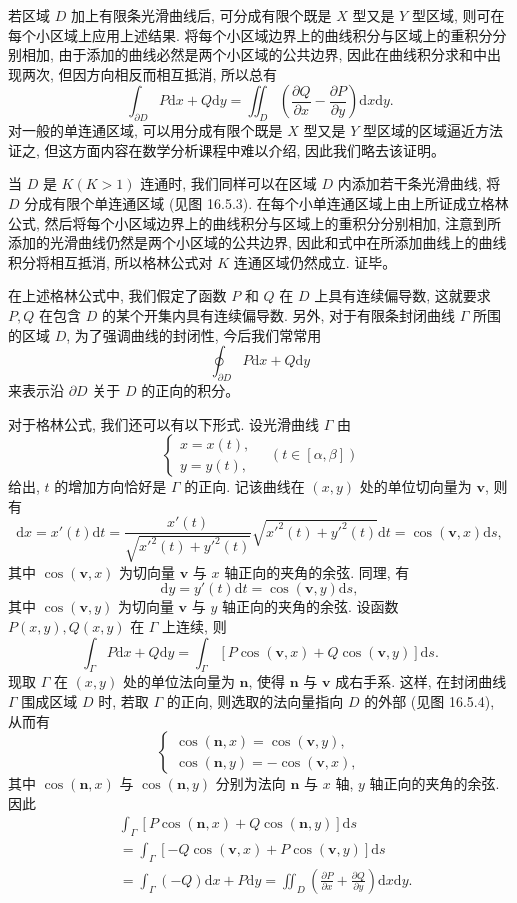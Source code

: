 \documentclass[UTF8, 12pt, fontset=fandol, oneside]{ctexart}
\begin{document}
若区域 $D$ 加上有限条光滑曲线后, 可分成有限个既是 $X$ 型又是 $Y$ 型区域, 则可在每个小区域上应用上述结果. 将每个小区域边界上的曲线积分与区域上的重积分分别相加, 由于添加的曲线必然是两个小区域的公共边界, 因此在曲线积分求和中出现两次, 但因方向相反而相互抵消, 所以总有
\[
  \int_{\partial D}P\mathrm dx+Q\mathrm dy
  =\iint_D\left(\frac{\partial Q}{\partial x}-\frac{\partial P}{\partial y}\right)\mathrm dx\mathrm dy.
\]
对一般的单连通区域, 可以用分成有限个既是 $X$ 型又是 $Y$ 型区域的区域逼近方法证之, 但这方面内容在数学分析课程中难以介绍, 因此我们略去该证明。

当 $D$ 是 $K(K>1)$ 连通时, 我们同样可以在区域 $D$ 内添加若干条光滑曲线, 将 $D$ 分成有限个单连通区域 (见图 16.5.3). 在每个小单连通区域上由上所证成立格林公式, 然后将每个小区域边界上的曲线积分与区域上的重积分分别相加, 注意到所添加的光滑曲线仍然是两个小区域的公共边界, 因此和式中在所添加曲线上的曲线积分将相互抵消, 所以格林公式对 $K$ 连通区域仍然成立. 证毕。

在上述格林公式中, 我们假定了函数 $P$ 和 $Q$ 在 $D$ 上具有连续偏导数, 这就要求 $P,Q$ 在包含 $D$ 的某个开集内具有连续偏导数. 另外, 对于有限条封闭曲线 $\Gamma$ 所围的区域 $D$, 为了强调曲线的封闭性, 今后我们常常用
\[
  \oint_{\partial D}P\mathrm dx+Q\mathrm dy
\]
来表示沿 $\partial D$ 关于 $D$ 的正向的积分。

对于格林公式, 我们还可以有以下形式. 设光滑曲线 $\Gamma$ 由
\[
  \begin{cases}
    x=x(t),\\
    y=y(t),
  \end{cases}\quad (t\in[\alpha,\beta])
\]
给出, $t$ 的增加方向恰好是 $\Gamma$ 的正向. 记该曲线在 $(x,y)$ 处的单位切向量为 $\boldsymbol v$, 则有
\[
  \mathrm dx=x'(t)\mathrm dt
  =\frac{x'(t)}{\sqrt{x'^2(t)+y'^2(t)}}\sqrt{x'^2(t)+y'^2(t)}\mathrm dt
  =\cos(\boldsymbol v,x)\mathrm ds,
\]
其中 $\cos(\boldsymbol v,x)$ 为切向量 $\boldsymbol v$ 与 $x$ 轴正向的夹角的余弦. 同理, 有
\[
  \mathrm dy=y'(t)\mathrm dt=\cos(\boldsymbol v,y)\mathrm ds,
\]
其中 $\cos(\boldsymbol v,y)$ 为切向量 $\boldsymbol v$ 与 $y$ 轴正向的夹角的余弦. 设函数 $P(x,y),Q(x,y)$ 在 $\Gamma$ 上连续, 则
\[
  \int_\Gamma P\mathrm dx+Q\mathrm dy
  =\int_\Gamma[P\cos(\boldsymbol v,x)+Q\cos(\boldsymbol v,y)]\mathrm ds.
\]
现取 $\Gamma$ 在 $(x,y)$ 处的单位法向量为 $\boldsymbol n$, 使得 $\boldsymbol n$ 与 $\boldsymbol v$ 成右手系. 这样, 在封闭曲线 $\Gamma$ 围成区域 $D$ 时, 若取 $\Gamma$ 的正向, 则选取的法向量指向 $D$ 的外部 (见图 16.5.4), 从而有
\[
  \begin{cases}
    \cos(\boldsymbol n,x)=\cos(\boldsymbol v,y),\\
    \cos(\boldsymbol n,y)=-\cos(\boldsymbol v,x),
  \end{cases}
\]
其中 $\cos(\boldsymbol n,x)$ 与 $\cos(\boldsymbol n,y)$ 分别为法向 $\boldsymbol n$ 与 $x$ 轴, $y$ 轴正向的夹角的余弦. 因此
\[
\begin{aligned}
  &\int_\Gamma[P\cos(\boldsymbol n,x)+Q\cos(\boldsymbol n,y)]\mathrm ds\\
  &=\int_\Gamma[-Q\cos(\boldsymbol v,x)+P\cos(\boldsymbol v,y)]\mathrm ds\\
  &=\int_\Gamma(-Q)\mathrm dx+P\mathrm dy
  =\iint_D\left(\frac{\partial P}{\partial x}+\frac{\partial Q}{\partial y}\right)\mathrm dx\mathrm dy.
\end{aligned}
\]
\end{document}

